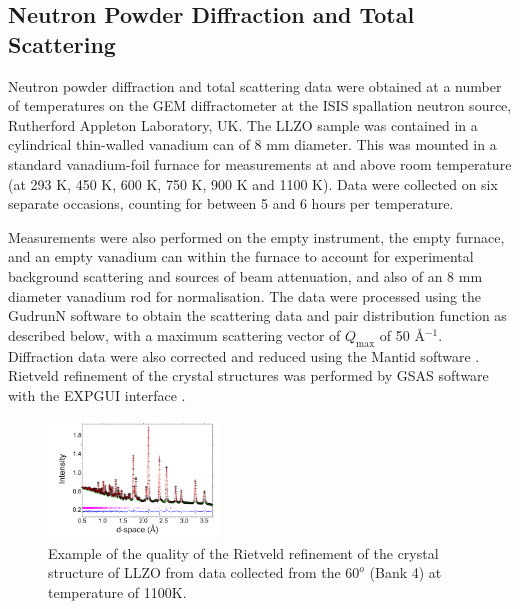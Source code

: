 \documentclass[twoside,twocolumn,9pt]{article}
\begin{document}
\subsection{Neutron Powder Diffraction and Total Scattering}

Neutron powder diffraction and total scattering data were obtained at a number of temperatures on the GEM diffractometer \cite{Hannon:2005cy} at the
ISIS spallation neutron source, Rutherford Appleton Laboratory, UK. The LLZO sample was contained in a cylindrical thin-walled vanadium can of 8 mm diameter.
This was mounted in a standard vanadium-foil furnace for measurements at and above room temperature (at 293 K, 450 K, 600 K, 750 K,
900 K and 1100 K). Data were collected on six separate occasions, counting for between 5 and 6 hours per temperature.

Measurements were also performed on the empty instrument, the empty furnace, and an empty vanadium can within the furnace to account for experimental background scattering and sources of beam attenuation, and also of an 8 mm diameter vanadium rod for normalisation. The data were processed using the GudrunN software \cite{Soper:2012vs} to obtain the scattering data and pair distribution function as described below, with a maximum scattering vector of $Q_\mathrm{max}$ of 50 \AA$^{-1}$. Diffraction data were also corrected and reduced using the Mantid software \cite{Arnold:2014iy}. Rietveld refinement of the crystal structures was performed by GSAS software \cite{Larson:2004wv} with the EXPGUI interface \cite{gsasgui}.

\begin{figure}[t]
\begin{center}
\includegraphics[width=0.4\textwidth]{Pics/1100KBank4v03.pdf}
\caption{Example of the quality of the Rietveld refinement of the crystal structure
 of LLZO from data collected from the $60^o$ (Bank 4) at temperature of 1100K.}
\label{fig:gsas}
\end{center}
\end{figure}
\end{document}
